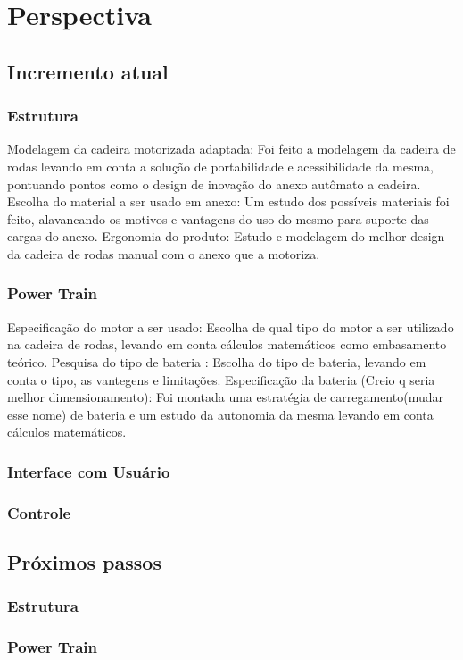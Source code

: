 \chapter[Perspectiva]{Perspectiva}

\section{Incremento atual}
  \subsection{Estrutura}
  Modelagem da cadeira motorizada adaptada: Foi feito a modelagem da cadeira de rodas levando em conta a solução de portabilidade e acessibilidade da mesma, pontuando pontos como o design de inovação do anexo autômato a cadeira.
  Escolha do material a ser usado em anexo: Um estudo dos possíveis materiais foi feito, alavancando os motivos e vantagens do uso do mesmo para suporte das cargas do anexo.
  Ergonomia do produto: Estudo e modelagem do melhor design da cadeira de rodas manual com o anexo que a motoriza. 
  \subsection{Power Train}
  Especificação do motor a ser usado: Escolha de qual tipo do motor a ser utilizado na cadeira de rodas, levando em conta cálculos matemáticos como embasamento teórico.
  Pesquisa do tipo de bateria : Escolha do tipo de bateria, levando em conta o tipo, as vantegens e limitações.
  Especificação da bateria (Creio q seria melhor dimensionamento): Foi montada uma estratégia de carregamento(mudar esse nome) de bateria e um estudo da autonomia da mesma levando em conta cálculos matemáticos.
  \subsection{Interface com Usuário}
  \subsection{Controle}

\section{Próximos passos}
  \subsection{Estrutura}
  \subsection{Power Train}
